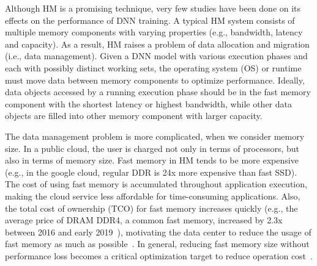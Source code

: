 \textcolor{dong2}{Although HM is a promising technique, very few studies have been done on its effects on the performance of DNN training. }
A typical HM system consists of multiple memory components with varying properties (e.g., bandwidth, latency and capacity). As a result, HM raises a problem of data allocation and migration (i.e., data management). Given a DNN model with various execution phases and each with possibly distinct working sets, \textcolor{dong2}{the operating system (OS) or runtime }must move data between memory components to optimize performance. Ideally, data objects accessed by a running execution phase should be in the fast memory component with the shortest latency or highest bandwidth, while other data objects are filled into other memory component with larger capacity. 


The data management problem is more complicated, when we consider memory size. In a public cloud, the user is charged not only in terms of processors, but also in terms of memory size. Fast memory in HM tends to be more expensive (e.g., in the google cloud, regular DDR is 24x more expensive than fast SSD). The cost of using fast memory is accumulated throughout application execution, making the cloud service less affordable for time-consuming applications. Also, the total cost of ownership (TCO) for fast memory increases quickly (e.g., the average price of DRAM DDR4, a common fast memory,  increased by 2.3x between 2016 and early 2019~\cite{ram_price, ram_price2}), motivating the data center to reduce the usage of fast memory as much as possible~\cite{Eisenman:2018:RDF:3190508.3190524}. In general, reducing fast memory size without performance loss becomes a critical optimization target to reduce operation cost~\cite{DBLP:journals/corr/abs-1901-10938, Eisenman:2018:RDF:3190508.3190524}.  

